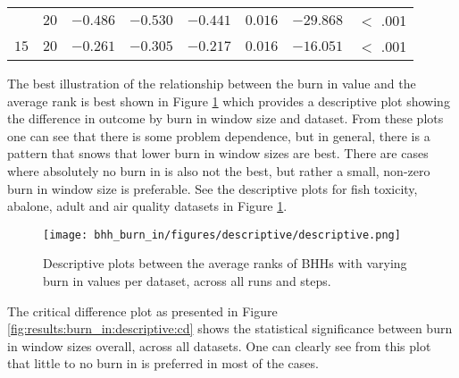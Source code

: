 \begin{table}[htbp]
{\begin{tabular}{lrrrrrrr}
			$ $                  & $20$                 & $-0.486$             & $-0.530$                                        & $-0.441$             & $0.016$              & $-29.868$            & $<$ .001    \\
			$15$                 & $20$                 & $-0.261$             & $-0.305$                                        & $-0.217$             & $0.016$              & $-16.051$            & $<$ .001    \\
			\bottomrule
		\end{tabular}
	}
\end{table}

The best illustration of the relationship between the burn in value and the average rank is best shown in Figure \ref{fig:results:burn_in:descriptive:descriptive} which provides a descriptive plot showing the difference in outcome by burn in window size and dataset. From these plots one can see that there is some problem dependence, but in general, there is a pattern that snows that lower burn in window sizes are best. There are cases where absolutely no burn in is also not the best, but rather a small, non-zero burn in window size is preferable. See the descriptive plots for fish toxicity, abalone, adult and air quality datasets in Figure \ref{fig:results:burn_in:descriptive:descriptive}.


\begin{figure}[htbp]
	\centering
	\texttt{[image: bhh\_burn\_in/figures/descriptive/descriptive.png]}
	\caption{Descriptive plots between the average ranks of \Acsp{BHH} with varying burn in values per dataset, across all runs and steps.}
	\label{fig:results:burn_in:descriptive:descriptive}
\end{figure}

The critical difference plot as presented in Figure \ref{fig:results:burn_in:descriptive:cd} shows the statistical significance between burn in window sizes overall, across all datasets. One can clearly see from this plot that little to no burn in is preferred in most of the cases.


